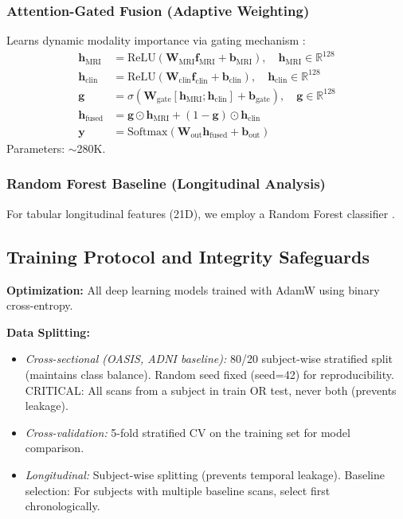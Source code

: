 \documentclass[conference]{IEEEtran}
\begin{document}
\subsubsection{Attention-Gated Fusion (Adaptive Weighting)}
Learns dynamic modality importance via gating mechanism \cite{Vaswani2017}:
\begin{align}
\mathbf{h}_{\text{MRI}} &= \text{ReLU}(\mathbf{W}_{\text{MRI}} \mathbf{f}_{\text{MRI}} + \mathbf{b}_{\text{MRI}}), \quad \mathbf{h}_{\text{MRI}} \in \mathbb{R}^{128} \\
\mathbf{h}_{\text{clin}} &= \text{ReLU}(\mathbf{W}_{\text{clin}} \mathbf{f}_{\text{clin}} + \mathbf{b}_{\text{clin}}), \quad \mathbf{h}_{\text{clin}} \in \mathbb{R}^{128} \\
\mathbf{g} &= \sigma(\mathbf{W}_{\text{gate}} [\mathbf{h}_{\text{MRI}}; \mathbf{h}_{\text{clin}}] + \mathbf{b}_{\text{gate}}), \quad \mathbf{g} \in \mathbb{R}^{128} \\
\mathbf{h}_{\text{fused}} &= \mathbf{g} \odot \mathbf{h}_{\text{MRI}} + (1 - \mathbf{g}) \odot \mathbf{h}_{\text{clin}} \\
\mathbf{y} &= \text{Softmax}(\mathbf{W}_{\text{out}} \mathbf{h}_{\text{fused}} + \mathbf{b}_{\text{out}})
\end{align}
Parameters: $\sim$280K.

\subsubsection{Random Forest Baseline (Longitudinal Analysis)}
For tabular longitudinal features (21D), we employ a Random Forest classifier \cite{Breiman2001, Pedregosa2011}.

\subsection{Training Protocol and Integrity Safeguards}

\textbf{Optimization:} All deep learning models trained with AdamW \cite{Loshchilov2019} using binary cross-entropy.

\textbf{Data Splitting:} 
\begin{itemize}
\item \textit{Cross-sectional (OASIS, ADNI baseline):} 80/20 subject-wise stratified split (maintains class balance). Random seed fixed (seed=42) for reproducibility. CRITICAL: All scans from a subject in train OR test, never both (prevents leakage).
\item \textit{Cross-validation:} 5-fold stratified CV on the training set for model comparison.
\item \textit{Longitudinal:} Subject-wise splitting (prevents temporal leakage). Baseline selection: For subjects with multiple baseline scans, select first chronologically.
\end{itemize}
\end{document}
